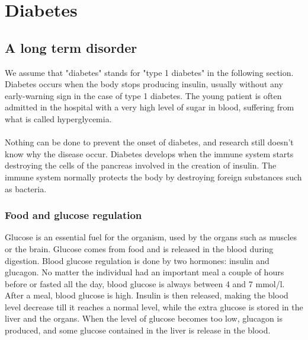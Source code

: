 



\section{Diabetes}

\subsection{A long term disorder}%
We assume that "diabetes" stands for "type 1 diabetes" in the following section. Diabetes occurs when the body stops producing insulin, usually without any early-warning sign in the case of type 1 diabetes. The young patient is often admitted in the hospital with a very high level of sugar in blood, suffering from what is called hyperglycemia.
\paragraph{}

Nothing can be done to prevent the onset of diabetes, and research still doesn't know why the disease occur. Diabetes develops when the immune system starts destroying the cells of the pancreas involved in the creation of insulin. The immune system normally protects the body by destroying foreign substances such as bacteria. 

\subsubsection{Food and glucose regulation}
Glucose is an essential fuel for the organism, used by the organs such as muscles or the brain. Glucose comes from food and is released in the blood during digestion. Blood glucose regulation is done by two hormones: insulin and glucagon. No matter the individual had an important meal a couple of hours before or fasted all the day, blood glucose is always between 4 and 7 mmol/l. 
\\After a meal, blood glucose is high. Insulin is then released, making the blood level decrease till it reaches a normal level, while the extra glucose is stored in the liver and the organs. When the level of glucose becomes too low, glucagon is produced, and some glucose contained in the liver is release in the blood. 

